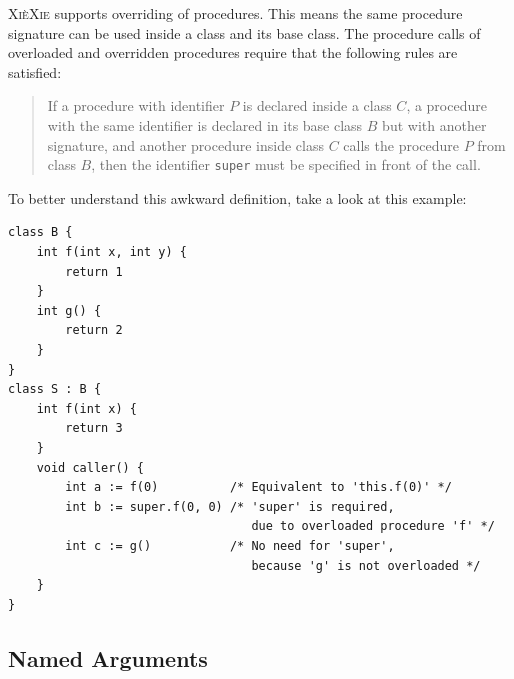 \documentclass[a5paper]{report}
\def\xiexie{\textsc{Xi\`eXie}\xspace}
\begin{document}
\xiexie supports overriding of procedures. This means the same procedure signature can be used inside a class and its
base class. The procedure calls of overloaded and overridden procedures require that the following rules are satisfied:
\begin{quote}
	If a procedure with identifier $P$ is declared inside a class $C$, a procedure with the same identifier is declared
	in its base class $B$ but with another signature, and another procedure inside class $C$ calls the procedure $P$
	from class $B$, then the identifier \texttt{super} must be specified in front of the call.
\end{quote}
To better understand this awkward definition, take a look at this example:
\begin{lstlisting}
class B {
    int f(int x, int y) {
        return 1
    }
    int g() {
        return 2
    }
}
class S : B {
    int f(int x) {
        return 3
    }
    void caller() {
        int a := f(0)          /* Equivalent to 'this.f(0)' */
        int b := super.f(0, 0) /* 'super' is required,
                                  due to overloaded procedure 'f' */
        int c := g()           /* No need for 'super',
                                  because 'g' is not overloaded */
    }
}
\end{lstlisting}

\subsection{Named Arguments}
\end{document}
